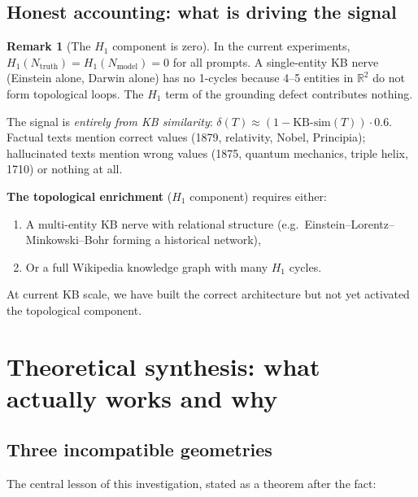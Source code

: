 \documentclass[11pt]{amsart}
\theoremstyle{definition}
\newtheorem{remark}[theorem]{Remark}
\newcommand{\Nmod}{N_{\mathrm{model}}}
\newcommand{\Ntruth}{N_{\mathrm{truth}}}
\begin{document}
\subsection{Honest accounting: what is driving the signal}

\begin{remark}[The $H_1$ component is zero]
In the current experiments, $H_1(\Ntruth) = H_1(\Nmod) = 0$ for all prompts.
A single-entity KB nerve (Einstein alone, Darwin alone) has no 1-cycles
because 4--5 entities in $\mathbb{R}^2$ do not form topological loops.
The $H_1$ term of the grounding defect contributes nothing.

The signal is \emph{entirely from KB similarity}:
$\delta(T) \approx (1 - \mathrm{KB\text{-}sim}(T)) \cdot 0.6$.
Factual texts mention correct values (1879, relativity, Nobel, Principia);
hallucinated texts mention wrong values (1875, quantum mechanics, triple helix, 1710)
or nothing at all.

\textbf{The topological enrichment} ($H_1$ component) requires either:
\begin{enumerate}
\item A multi-entity KB nerve with relational structure
  (e.g.\ Einstein--Lorentz--Minkowski--Bohr forming a historical network),
\item Or a full Wikipedia knowledge graph with many $H_1$ cycles.
\end{enumerate}
At current KB scale, we have built the correct architecture but not yet
activated the topological component.
\end{remark}

\section{Theoretical synthesis: what actually works and why}
\label{sec:synthesis}

\subsection{Three incompatible geometries}

The central lesson of this investigation, stated as a theorem after the fact:
\end{document}
